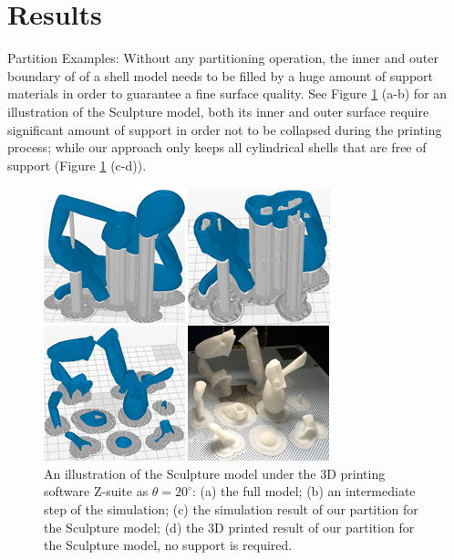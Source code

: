 \section{Results}

Partition Examples: Without any partitioning operation, the inner and outer boundary of of a shell model needs to be filled by a huge amount of support materials in order to guarantee a fine surface quality. See Figure \ref{fig:dear-simulation} (a-b) for an illustration of the Sculpture model, both its inner and outer surface require significant amount of support in order not to be collapsed during the printing process; while our approach only keeps all cylindrical shells that are free of support (Figure \ref{fig:dear-simulation} (c-d)).

\begin{figure}[tbp]
  \centering
  \includegraphics[width=\linewidth]{figs/dear-simulation.png}
  \caption{\label{fig:dear-simulation}%
           An illustration of the Sculpture model under the 3D printing software Z-suite as $\theta = 20^{\circ}$: (a) the full model; (b) an intermediate step of the simulation; (c) the simulation result of our partition for the Sculpture model; (d) the 3D printed result of our partition for the Sculpture model, no support is required.}
\end{figure}


